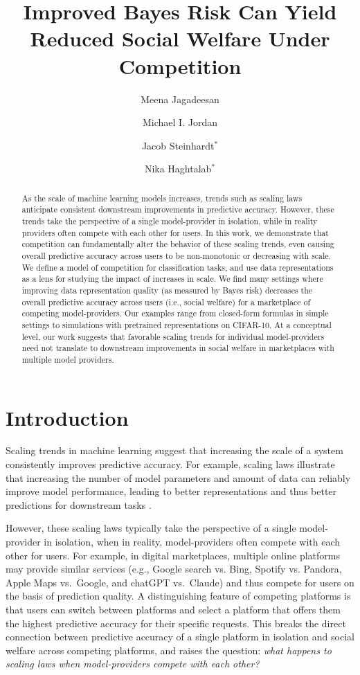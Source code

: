 \documentclass[letterpaper,11pt]{article}
\title{\Large{Improved Bayes Risk Can Yield Reduced Social Welfare Under Competition}}
\author{Meena Jagadeesan}
\author{Michael I. Jordan}
\author{Jacob Steinhardt$^*$}
\author{Nika Haghtalab$^*$}
\affil{University of California, Berkeley}
\date{}%
\theoremstyle{plain}
\begin{document}
\maketitle

\begin{abstract}
As the scale of machine learning models increases, trends such as scaling laws anticipate consistent downstream improvements in predictive accuracy. However, these trends take the perspective of a single model-provider in isolation, while in reality providers often compete with each other for users. In this work, we demonstrate that competition can fundamentally alter the behavior of these scaling trends, even causing overall predictive accuracy across users to be non-monotonic or decreasing with scale. We define a model of competition for classification tasks, and use data representations as a lens for studying the impact of increases in scale. We find many settings where improving data representation quality (as measured by Bayes risk) decreases the overall predictive accuracy across users (i.e., social welfare) for a marketplace of competing model-providers. Our examples range from closed-form formulas in simple settings to simulations with pretrained representations on CIFAR-10. 
At a conceptual level, our work suggests that favorable scaling trends for individual model-providers need not translate to downstream improvements in  social welfare in marketplaces with  multiple model providers. 
\end{abstract}

\section{Introduction}

Scaling trends in machine learning suggest that increasing the scale of a system consistently improves predictive accuracy. For example, scaling laws illustrate that increasing the number of model parameters  \citep{K20, SK20, B21} and amount of data \citep{H22} can reliably improve model performance, leading to better representations and thus better predictions for downstream tasks \citep{hernandez2021scaling}. 


\def\thefootnote{*}\def\thefootnote{\arabic{footnote}}

However, these scaling laws typically take the perspective of a single model-provider in isolation, when in reality, model-providers often compete with each other for users. For example, in digital marketplaces, multiple online platforms  may provide similar services (e.g., Google search vs. Bing, Spotify vs. Pandora, Apple Maps vs.\ Google, and chatGPT vs.\ Claude) and thus compete for users  on the basis of prediction quality. A distinguishing feature of competing platforms is that users can switch between platforms and select a platform that offers them the highest predictive accuracy for their specific requests. This breaks the direct connection between predictive accuracy of a single platform in isolation and social welfare across competing platforms, and raises the question: \textit{what happens to scaling laws when model-providers compete with each other?}
\end{document}

